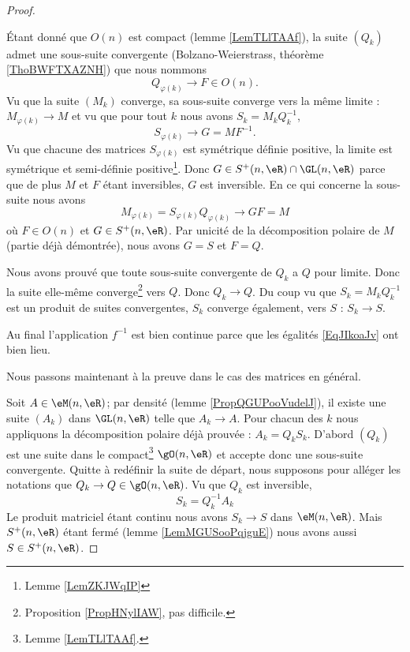\begin{proof}
\begin{subproof}
            Étant donné que \( O(n)\) est compact (lemme \ref{LemTLlTAAf}), la suite \( (Q_k)\) admet une sous-suite convergente (Bolzano-Weierstrass, théorème \ref{ThoBWFTXAZNH}) que nous nommons
            \begin{equation}
                Q_{\varphi(k)}\to F\in O(n).
            \end{equation}
            Vu que la suite \( (M_k)\) converge, sa sous-suite converge vers la même limite : \( M_{\varphi(k)}\to M\) et vu que pour tout \( k\) nous avons \( S_k=M_kQ_k^{-1}\),
            \begin{equation}
                S_{\varphi(k)}\to G=MF^{-1}.
            \end{equation}
            Vu que chacune des matrices \( S_{\varphi(k)}\) est symétrique définie positive, la limite est symétrique et semi-définie positive\footnote{Lemme \ref{LemZKJWqIP}}. Donc \( G\in S^+(n,\eR)\cap \GL(n,\eR)\) parce que de plus \( M\) et \( F\) étant inversibles, \( G\) est inversible. En ce qui concerne la sous-suite nous avons
            \begin{equation}
                M_{\varphi(k)}=S_{\varphi(k)}Q_{\varphi(k)}\to GF=M
            \end{equation}
            où \( F\in O(n)\) et \( G\in S^+(n,\eR)\). Par unicité de la décomposition polaire de \( M\) (partie déjà démontrée), nous avons \( G=S\) et \( F=Q\).

            Nous avons prouvé que toute sous-suite convergente de \( Q_k\) a \( Q\) pour limite. Donc la suite elle-même converge\footnote{Proposition \ref{PropHNylIAW}, pas difficile.} vers \( Q\). Donc \( Q_k\to Q\). Du coup vu que \( S_k=M_kQ_k^{-1}\) est un produit de suites convergentes, \( S_k\) converge également, vers \( S\) :  \( S_k\to S\).

            Au final l'application \( f^{-1}\) est bien continue parce que les égalités \eqref{EqJIkoaJv} ont bien lieu.
    \end{subproof}

    Nous passons maintenant à la preuve dans le cas des matrices en général.

    Soit \( A\in \eM(n,\eR)\); par densité (lemme \ref{PropQGUPooVudelJ}), il existe une suite \( (A_k)\) dans \( \GL(n,\eR)\) telle que \( A_k\to A\). Pour chacun des \( k\) nous appliquons la décomposition polaire déjà prouvée : \( A_k=Q_kS_k\). D'abord \( (Q_k)\) est une suite dans le compact\footnote{Lemme \ref{LemTLlTAAf}.} \( \gO(n,\eR)\) et accepte donc une sous-suite convergente. Quitte à redéfinir la suite de départ, nous supposons pour alléger les notations que \( Q_k\to Q\in \gO(n,\eR)\). Vu que \( Q_k\) est inversible, 
    \begin{equation}
        S_k=Q^{-1}_kA_k
    \end{equation}
    Le produit matriciel étant continu nous avons \( S_k\to S\) dans \( \eM(n,\eR)\). Mais \( S^+(n,\eR)\) étant fermé (lemme \ref{LemMGUSooPqjguE}) nous avons aussi \( S\in S^+(n,\eR)\).
\end{proof}


